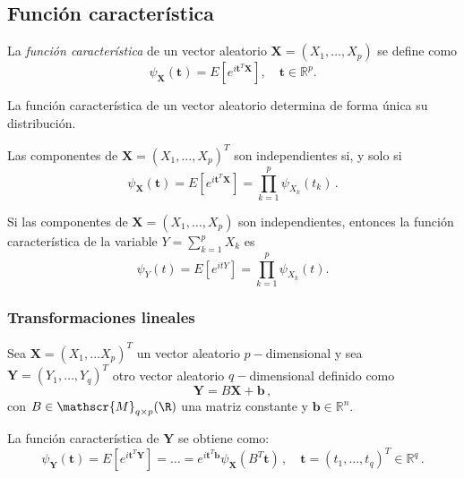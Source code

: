\subsection{Función característica}

\begin{ndef} \label{funcioncaracteristica}
    La \emph{función característica} de un vector aleatorio \(\boldsymbol X = (X_1,\dots,X_p)\) se define como \[\psi_{\boldsymbol X}(\boldsymbol t)=E\left[e^{i\boldsymbol t^T\boldsymbol X}\right], \quad \boldsymbol t\in \mathbb{R}^p.\]
\end{ndef}

\begin{nth}[Unicidad]
  La función característica de un vector aleatorio determina de forma única su distribución.
\end{nth}

\begin{nprop}
  Las componentes de \(\boldsymbol X=(X_1,\dots,X_p)^T\) son independientes si, y solo si \[\psi_{\boldsymbol X}(\boldsymbol t)=E\left[e^{i\boldsymbol t^T\boldsymbol X}\right] = \prod_{k=1}^p\psi_{X_k}(t_k)\,.\]
\end{nprop}

\begin{nprop}
  Si las componentes de \(\boldsymbol X=(X_1,\dots, X_p)\) son independientes, entonces la función característica de la variable \(Y=\sum_{k=1}^p X_k\) es \[\psi_{Y}(t)=E\left[e^{itY}\right] = \prod_{k=1}^p\psi_{X_k}(t).\]
\end{nprop}

\subsubsection{Transformaciones lineales}

Sea $\boldsymbol X = (X_1, \dots X_p)^T$ un vector aleatorio $p-$dimensional y sea $\boldsymbol Y = (Y_1,\dots,Y_q)^T$ otro vector aleatorio $q-$dimensional definido como
\[
  \boldsymbol Y = B\boldsymbol X + \boldsymbol b\,,
\]
con $B \in \mathscr{M}_{q\times p}(\R)$ una matriz constante y $\boldsymbol b\in \mathbb R ^n$.

\begin{nprop}
  La función característica de $\boldsymbol Y$ se obtiene como:
  \[
  \psi_{\boldsymbol Y}(\boldsymbol t) = E\left[e^{i\boldsymbol t^T \boldsymbol Y}\right] = \dots = e^{i\boldsymbol t^T \boldsymbol b} \psi_{\boldsymbol X}(B^T \boldsymbol t)\,, \quad \boldsymbol t = (t_1,\dots,t_q)^T \in \mathbb R^q\,.
  \]
\end{nprop}

